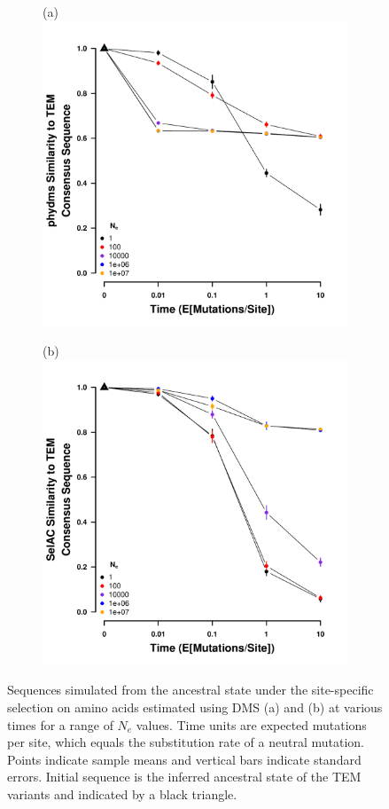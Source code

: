 \documentclass[fleqn,letterpaper]{article}
\begin{document}
\begin{figure}
    \centering
    \begin{subfigure}
        \centering
       (a)\includegraphics[width=.45\textwidth]{img/simulated_dist_time_DMS_ancest.pdf}
    \end{subfigure}
    \begin{subfigure}
        \centering
        (b)\includegraphics[width=.45\textwidth]{img/simulated_dist_time_SELAC_ancest.pdf}
    \end{subfigure}
    \caption{Sequences simulated from the ancestral state under the site-specific selection on amino acids estimated using DMS (a) and \selac (b) at various times for a range of $N_e$ values.
    Time units are expected mutations per site, which equals the substitution rate of a neutral mutation.
    Points indicate sample means and vertical bars indicate standard errors. Initial sequence is the inferred ancestral state of the TEM variants and indicated by a black triangle.}
    \label{fig:dis_sim}
\end{figure}

\clearpage
\end{document}
